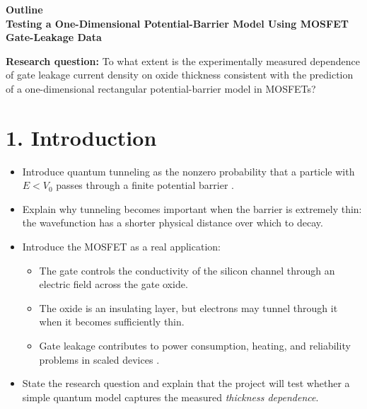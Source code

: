 \documentclass[12pt]{article}
\begin{document}
\begin{center}
    {\large\bfseries  Outline}\\[4pt]
    {\bfseries Testing a One-Dimensional Potential-Barrier Model Using MOSFET Gate-Leakage Data}
\end{center}

\textbf{Research question:} To what extent is the experimentally measured dependence of gate leakage current density on oxide thickness consistent with the prediction of a one-dimensional rectangular potential-barrier model in MOSFETs?

\section*{1. Introduction}
\begin{itemize}
    \item Introduce quantum tunneling as the nonzero probability that a particle with \(E<V_0\) passes through a finite potential barrier \cite{townsend2010}.
    \item Explain why tunneling becomes important when the barrier is extremely thin: the wavefunction has a shorter physical distance over which to decay.
    \item Introduce the MOSFET as a real application:
    \begin{itemize}
        \item The gate controls the conductivity of the silicon channel through an electric field across the gate oxide.
        \item The oxide is an insulating layer, but electrons may tunnel through it when it becomes sufficiently thin.
        \item Gate leakage contributes to power consumption, heating, and reliability problems in scaled devices \cite{green2001review}.
    \end{itemize}
    \item State the research question and explain that the project will test whether a simple quantum model captures the measured \emph{thickness dependence}.
\end{itemize}
\end{document}
